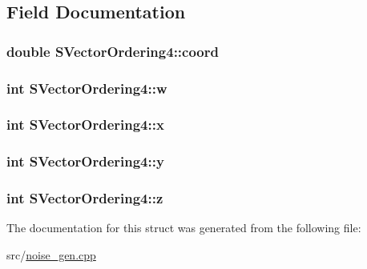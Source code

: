 \subsection{Field Documentation}
\hypertarget{structSVectorOrdering4_aaeaa6fd9fda9cf73a981a1d9e443c13b}{
\subsubsection[{coord}]{\setlength{\rightskip}{0pt plus 5cm}double {\bf SVectorOrdering4::coord}}}
\label{structSVectorOrdering4_aaeaa6fd9fda9cf73a981a1d9e443c13b}
\hypertarget{structSVectorOrdering4_a40e736f8e2ff933b04618360bf6ca3c2}{
\subsubsection[{w}]{\setlength{\rightskip}{0pt plus 5cm}int {\bf SVectorOrdering4::w}}}
\label{structSVectorOrdering4_a40e736f8e2ff933b04618360bf6ca3c2}
\hypertarget{structSVectorOrdering4_aaaf19eb8fdb1c6ae540c2496e6053f67}{
\subsubsection[{x}]{\setlength{\rightskip}{0pt plus 5cm}int {\bf SVectorOrdering4::x}}}
\label{structSVectorOrdering4_aaaf19eb8fdb1c6ae540c2496e6053f67}
\hypertarget{structSVectorOrdering4_a4b3999f70688bfcded7e15105e8446bc}{
\subsubsection[{y}]{\setlength{\rightskip}{0pt plus 5cm}int {\bf SVectorOrdering4::y}}}
\label{structSVectorOrdering4_a4b3999f70688bfcded7e15105e8446bc}
\hypertarget{structSVectorOrdering4_aa0df102e7f74b1cf5c38953cdd0c7bef}{
\subsubsection[{z}]{\setlength{\rightskip}{0pt plus 5cm}int {\bf SVectorOrdering4::z}}}
\label{structSVectorOrdering4_aa0df102e7f74b1cf5c38953cdd0c7bef}


The documentation for this struct was generated from the following file:\begin{DoxyCompactItemize}
\item 
src/\hyperlink{noise__gen_8cpp}{noise\_\-gen.cpp}\end{DoxyCompactItemize}
